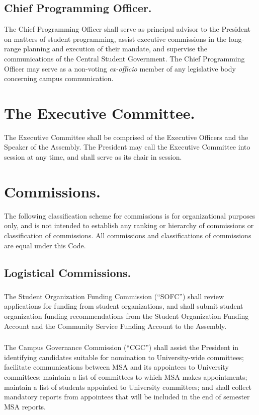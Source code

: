\subsection{Chief Programming Officer.}
The Chief Programming Officer shall serve as principal advisor to the President on matters of student programming, assist executive commissions in the long-range planning and execution of their mandate, and supervise the communications of the Central Student Government. The Chief Programming Officer may serve as a non-voting \textit{ex-officio} member of any legislative body concerning campus communication.


\section{The Executive Committee.}
The Executive Committee shall be comprised of the Executive Officers and the Speaker of the Assembly.  The President may call the Executive Committee into session at any time, and shall serve as its chair in session.


\section{Commissions.}
The following classification scheme for commissions is for organizational purposes only, and is not intended to establish any ranking or hierarchy of commissions or classification of commissions.  All commissions and classifications of commissions are equal under this Code.

\subsection{Logistical Commissions.}

\subsubsection{}
The Student Organization Funding Commission (``SOFC'') shall review applications for funding from student organizations, and shall submit student organization funding recommendations from the Student Organization Funding Account and the Community Service Funding Account to the Assembly.

\subsubsection{}
The Campus Governance Commission (``CGC'') shall
\subsubsubsection{}
assist the President in identifying candidates suitable for nomination to University-wide committees;
\subsubsubsection{}
facilitate communications between MSA and its appointees to University committees; 
\subsubsubsection{}
maintain a list of committees to which MSA makes appointments;
\subsubsubsection{}
maintain a list of students appointed to University committees; and
\subsubsubsection{}
shall collect mandatory reports from appointees that will be included in the end of semester MSA reports.

